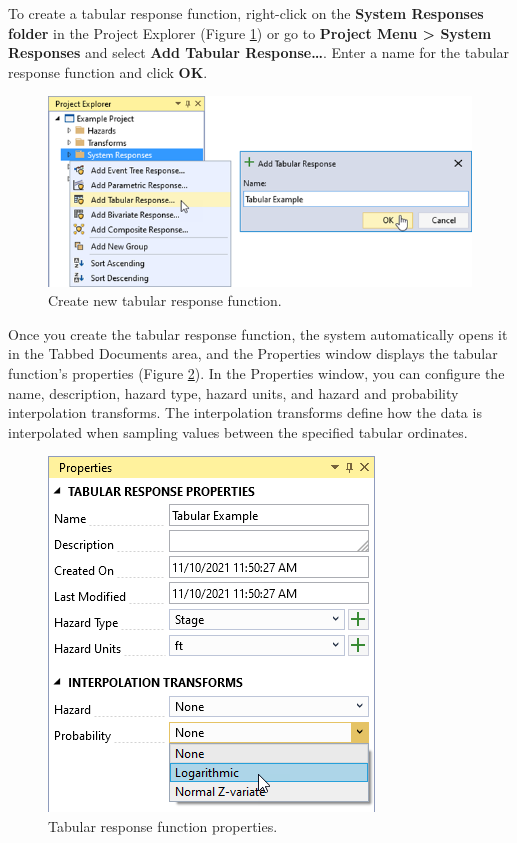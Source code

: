 \documentclass[
]{book}
\begin{document}
To create a tabular response function, right-click on the \textbf{System Responses folder} in the Project Explorer (Figure \ref{fig:figure-102}) or go to \textbf{Project Menu \textgreater{} System Responses} and select \textbf{Add Tabular Response\ldots{}}. Enter a name for the tabular response function and click \textbf{OK}.

\begin{figure}

{\centering \includegraphics{images/figure102} 

}

\caption{Create new tabular response function.}\label{fig:figure-102}
\end{figure}

Once you create the tabular response function, the system automatically opens it in the Tabbed Documents area, and the Properties window displays the tabular function's properties (Figure \ref{fig:figure-103}). In the Properties window, you can configure the name, description, hazard type, hazard units, and hazard and probability interpolation transforms. The interpolation transforms define how the data is interpolated when sampling values between the specified tabular ordinates.

\begin{figure}

{\centering \includegraphics{images/figure103} 

}

\caption{Tabular response function properties.}\label{fig:figure-103}
\end{figure}
\end{document}
